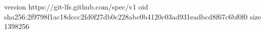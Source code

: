 version https://git-lfs.github.com/spec/v1
oid sha256:2f9798f1ac18dccc2fd0f27db0c228abc0b4120c03ad931eadbcd8f67c6bf0f0
size 1398256
